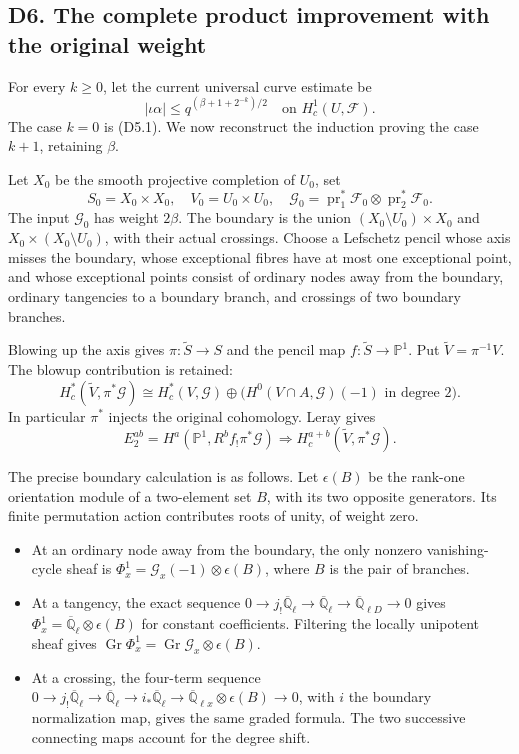 \subsection{D6. The complete product improvement with the original
weight}\label{d6.-the-complete-product-improvement-with-the-original-weight}

For every \(k\ge0\), let the current universal curve estimate be \[
|\iota\alpha|\le q^{(\beta+1+2^{-k})/2}
\quad\text{on }H_c^1(U,\mathcal F).
\tag{D6.1}
\] The case \(k=0\) is (D5.1). We now reconstruct the induction proving
the case \(k+1\), retaining \(\beta\).

Let \(X_0\) be the smooth projective completion of \(U_0\), set \[
S_0=X_0\times X_0,\quad V_0=U_0\times U_0,\quad
\mathcal G_0=\operatorname{pr}_1^*\mathcal F_0
\otimes\operatorname{pr}_2^*\mathcal F_0.
\tag{D6.2}
\] The input \(\mathcal G_0\) has weight \(2\beta\). The boundary is the
union \((X_0\setminus U_0)\times X_0\) and
\(X_0\times(X_0\setminus U_0)\), with their actual crossings. Choose a
Lefschetz pencil whose axis misses the boundary, whose exceptional
fibres have at most one exceptional point, and whose exceptional points
consist of ordinary nodes away from the boundary, ordinary tangencies to
a boundary branch, and crossings of two boundary branches.

Blowing up the axis gives \(\pi:\widetilde S\to S\) and the pencil map
\(f:\widetilde S\to\mathbb P^1\). Put \(\widetilde V=\pi^{-1}V\). The
blowup contribution is retained: \[
H_c^*(\widetilde V,\pi^*\mathcal G)
\cong H_c^*(V,\mathcal G)\oplus
\bigl(H^0(V\cap A,\mathcal G)(-1)\text{ in degree }2\bigr).
\tag{D6.3}
\] In particular \(\pi^*\) injects the original cohomology. Leray gives
\[
E_2^{ab}=H^a(\mathbb P^1,R^bf_!\pi^*\mathcal G)
\Longrightarrow H_c^{a+b}(\widetilde V,\pi^*\mathcal G).
\tag{D6.4}
\]

The precise boundary calculation is as follows. Let \(\epsilon(B)\) be
the rank-one orientation module of a two-element set \(B\), with its two
opposite generators. Its finite permutation action contributes roots of
unity, of weight zero.

\begin{itemize}
\tightlist
\item
  At an ordinary node away from the boundary, the only nonzero
  vanishing-cycle sheaf is
  \(\Phi_x^1=\mathcal G_x(-1)\otimes\epsilon(B)\), where \(B\) is the
  pair of branches.
\item
  At a tangency, the exact sequence
  \(0\to j_!\overline{\mathbb Q}_\ell\to\overline{\mathbb Q}_\ell
  \to\overline{\mathbb Q}_{\ell D}\to0\) gives
  \(\Phi_x^1=\overline{\mathbb Q}_\ell\otimes\epsilon(B)\) for constant
  coefficients. Filtering the locally unipotent sheaf gives
  \(\operatorname{Gr}\Phi_x^1=\operatorname{Gr}\mathcal G_x\otimes\epsilon(B)\).
\item
  At a crossing, the four-term sequence
  \(0\to j_!\overline{\mathbb Q}_\ell\to\overline{\mathbb Q}_\ell
  \to i_*\overline{\mathbb Q}_\ell
  \to\overline{\mathbb Q}_{\ell x}\otimes\epsilon(B)\to0\), with \(i\)
  the boundary normalization map, gives the same graded formula. The two
  successive connecting maps account for the degree shift.
\end{itemize}

